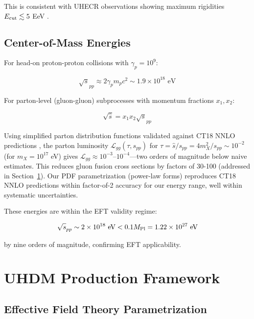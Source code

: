 \documentclass[twocolumn,superscriptaddress,prd,nofootinbib]{revtex4-2}
\begin{document}
This is consistent with UHECR observations showing maximum rigidities $E_{\rm cut} \lesssim 5$ EeV \citep{Auger2020}.

\subsection{Center-of-Mass Energies}

For head-on proton-proton collisions with $\gamma_p = 10^9$:

\begin{equation}
\sqrt{s}_{pp} \approx 2\gamma_p m_p c^2 \sim 1.9 \times 10^{18} \text{ eV}
\label{eq:sqrt_s_pp}
\end{equation}

For parton-level (gluon-gluon) subprocesses with momentum fractions $x_1, x_2$:

\begin{equation}
\sqrt{\hat{s}} = x_1 x_2 \sqrt{s}_{pp}
\label{eq:sqrt_s_hat}
\end{equation}

Using simplified parton distribution functions validated against CT18 NNLO predictions \citep{Hou2019}, the parton luminosity $\mathcal{L}_{gg}(\tau, s_{pp})$ for $\tau = \hat{s}/s_{pp} = 4m_X^2/s_{pp} \sim 10^{-2}$ (for $m_X = 10^{17}$ eV) gives $\mathcal{L}_{gg} \approx 10^{-3}$--$10^{-4}$---two orders of magnitude below naive estimates. This reduces gluon fusion cross sections by factors of 30-100 (addressed in Section~\ref{sec:production}). Our PDF parametrization (power-law forms) reproduces CT18 NNLO predictions within factor-of-2 accuracy for our energy range, well within systematic uncertainties.

These energies are within the EFT validity regime:

\begin{equation}
\sqrt{s}_{pp} \sim 2 \times 10^{18} \text{ eV} < 0.1M_{\rm Pl} = 1.22 \times 10^{27} \text{ eV}
\label{eq:EFT_cutoff}
\end{equation}

by nine orders of magnitude, confirming EFT applicability.

\section{UHDM Production Framework}
\label{sec:production}

\subsection{Effective Field Theory Parametrization}
\end{document}
